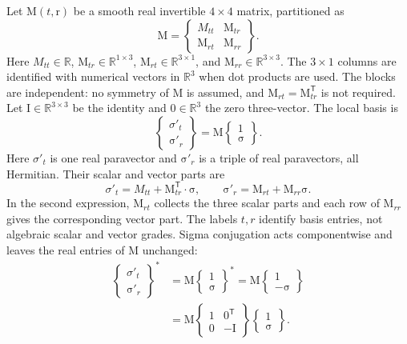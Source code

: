 \documentclass[11pt]{article}
\newcommand{\pvGreek}[1]{{#1}}
\newcommand{\vstyle}[1]{{\bm{\mathrm{#1}}}}
\newcommand{\pSigmaTPrime}{\pvsigma'_t}
\newcommand{\bsigRPrime}{\bsig'_r}
\newcommand{\pvsigma}{\pvGreek{\sigma}}
\numberwithin{equation}{section}
\newcommand{\R}{\mathbb{R}}
\newcommand{\dotprod}{\cdot}
\newcommand{\bsig}{\vstyle{\sigma}}
\newcommand{\br}{\vstyle{r}}
\newcommand{\bM}{\vstyle{M}}
\newcommand{\bI}{\vstyle{I}}
\begin{document}
Let $\bM(t,\br)$ be a smooth real invertible $4\times4$ matrix, partitioned as
\[
 \bM=\begin{Bmatrix}M_{tt}&\bM_{tr}\\\bM_{rt}&\bM_{rr}\end{Bmatrix}.
\]
Here $M_{tt}\in\R$, $\bM_{tr}\in\R^{1\times3}$,
$\bM_{rt}\in\R^{3\times1}$, and $\bM_{rr}\in\R^{3\times3}$.
The $3\times1$ columns are identified with numerical vectors in $\R^3$
when dot products are used.
The blocks are independent: no symmetry of $\bM$ is assumed, and
$\bM_{rt}=\bM_{tr}^{\mathsf T}$ is not required.
Let $\bI\in\R^{3\times3}$ be the identity and $\vstyle{0}\in\R^3$ the zero
three-vector. The local basis is
\begin{equation}
 \begin{Bmatrix}\pSigmaTPrime\\\bsigRPrime\end{Bmatrix}
 =\bM\begin{Bmatrix}1\\\bsig\end{Bmatrix}.
 \label{eq:spacetime-matrix-basis}
\end{equation}
Here $\pSigmaTPrime$ is one real paravector and $\bsigRPrime$ is a
triple of real paravectors, all Hermitian. Their scalar and vector parts are
\[
 \pSigmaTPrime=M_{tt}+\bM_{tr}^{\mathsf T}\dotprod\bsig,
 \qquad \bsigRPrime=\bM_{rt}+\bM_{rr}\bsig.
\]
In the second expression, $\bM_{rt}$ collects the three scalar parts
and each row of $\bM_{rr}$ gives the corresponding vector part.
The labels $t,r$ identify basis entries, not algebraic scalar and vector grades.
Sigma conjugation acts componentwise and
leaves the real entries of $\bM$ unchanged:
\begin{equation}
 \begin{aligned}
 \begin{Bmatrix}\pSigmaTPrime\\\bsigRPrime\end{Bmatrix}^{*}
 &=\bM\begin{Bmatrix}1\\\bsig\end{Bmatrix}^{*}
  =\bM\begin{Bmatrix}1\\-\bsig\end{Bmatrix}\\
 &=\bM\begin{Bmatrix}1&\vstyle{0}^{\mathsf T}\\\vstyle{0}&-\bI\end{Bmatrix}
       \begin{Bmatrix}1\\\bsig\end{Bmatrix}.
 \end{aligned}
 \label{eq:spacetime-basis-conjugation}
\end{equation}
\end{document}
